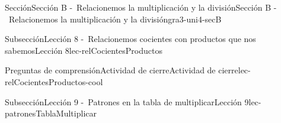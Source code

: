 \begin{sectionptx}{Sección}{Sección B -~Relacionemos la multiplicación y la división}{}{Sección B -~Relacionemos la multiplicación y la división}{}{}{gra3-uni4-secB}
\begin{subsectionptx}{Subsección}{Lección 8 -~Relacionemos cocientes con productos que nos sabemos}{}{Lección 8}{}{}{lec-relCocientesProductos}
%
\begin{reading-questions-subsubsection}{Preguntas de comprensión}{Actividad de cierre}{}{Actividad de cierre}{}{}{lec-relCocientesProductos-cool}
%
\end{reading-questions-subsubsection}
\end{subsectionptx}
%
%
\typeout{************************************************}
\typeout{************************************************}
%
\begin{subsectionptx}{Subsección}{Lección 9 -~Patrones en la tabla de multiplicar}{}{Lección 9}{}{}{lec-patronesTablaMultiplicar}
%
%
\typeout{************************************************}
\typeout{************************************************}
%


\end{subsectionptx}
\end{sectionptx}
